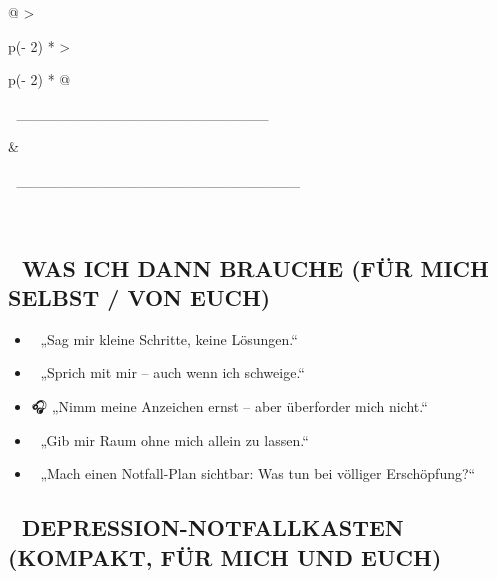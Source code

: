 \begin{longtable}[]{@{}
  >{\raggedright\arraybackslash}p{(\columnwidth - 2\tabcolsep) * }
  >{\raggedright\arraybackslash}p{(\columnwidth - 2\tabcolsep) * }@{}}
\toprule\noalign{}
\begin{minipage}[b]{\linewidth}\raggedright
📝 \_\_\_\_\_\_\_\_\_\_\_\_\_\_\_\_\_\_\_\_\_\_\_\_
\end{minipage} & \begin{minipage}[b]{\linewidth}\raggedright
📝 \_\_\_\_\_\_\_\_\_\_\_\_\_\_\_\_\_\_\_\_\_\_\_\_\_\_\_
\end{minipage} \\
\midrule\noalign{}
\endhead
\bottomrule\noalign{}
\endlastfoot
\end{longtable}

\hypertarget{was-ich-dann-brauche-fuxfcr-mich-selbst-von-euch}{%
\subsection{🧭 WAS ICH DANN BRAUCHE (FÜR MICH SELBST / VON EUCH)}\label{was-ich-dann-brauche-fuxfcr-mich-selbst-von-euch}}

\begin{itemize}
\tightlist
\item
  🧠 „Sag mir kleine Schritte, keine Lösungen.``
\end{itemize}

\begin{itemize}
\tightlist
\item
  💬 „Sprich mit mir -- auch wenn ich schweige.``
\end{itemize}

\begin{itemize}
\tightlist
\item
  🎧 „Nimm meine Anzeichen ernst -- aber überforder mich nicht.``
\end{itemize}

\begin{itemize}
\tightlist
\item
  🧍 „Gib mir Raum ohne mich allein zu lassen.``
\end{itemize}

\begin{itemize}
\tightlist
\item
  📎 „Mach einen Notfall-Plan sichtbar: Was tun bei völliger Erschöpfung?{}``
\end{itemize}

\hypertarget{depression-notfallkasten-kompakt-fuxfcr-mich-und-euch}{%
\subsection{🧰 DEPRESSION-NOTFALLKASTEN (KOMPAKT, FÜR MICH UND EUCH)}\label{depression-notfallkasten-kompakt-fuxfcr-mich-und-euch}}


